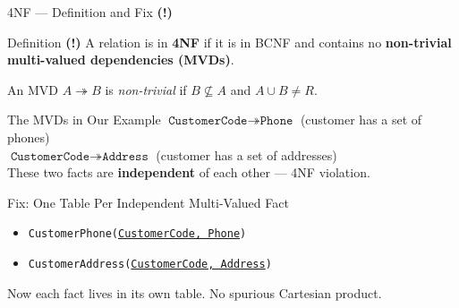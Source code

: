 \begin{frame}{4NF --- Definition and Fix \textbf{(!)}}
  \begin{block}{Definition \textbf{(!)}}
    A relation is in \textbf{4NF} if it is in BCNF and contains no
    \textbf{non-trivial multi-valued dependencies (MVDs)}.

    An MVD $A \twoheadrightarrow B$ is \emph{non-trivial} if $B \not\subseteq A$
    and $A \cup B \neq R$.
  \end{block}

  \begin{block}{The MVDs in Our Example}
    $\texttt{CustomerCode} \twoheadrightarrow \texttt{Phone}$ \quad
    (customer has a set of phones)\\
    $\texttt{CustomerCode} \twoheadrightarrow \texttt{Address}$ \quad
    (customer has a set of addresses)\\
    These two facts are \textbf{independent} of each other --- 4NF violation.
  \end{block}

  \begin{block}{Fix: One Table Per Independent Multi-Valued Fact}
    \begin{itemize}
      \item \texttt{CustomerPhone(\underline{CustomerCode, Phone})}
      \item \texttt{CustomerAddress(\underline{CustomerCode, Address})}
    \end{itemize}
    Now each fact lives in its own table.  No spurious Cartesian product.
  \end{block}
\end{frame}

